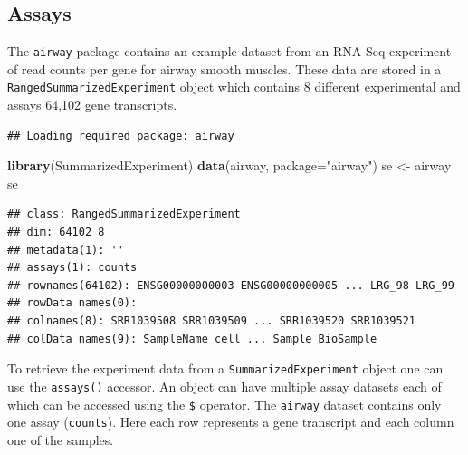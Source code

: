 \documentclass[]{article}
\newenvironment{Shaded}{\begin{snugshade}}{\end{snugshade}}
\newcommand{\DataTypeTok}[1]{\textcolor[rgb]{0.13,0.29,0.53}{#1}}
\newcommand{\KeywordTok}[1]{\textcolor[rgb]{0.13,0.29,0.53}{\textbf{#1}}}
\newcommand{\NormalTok}[1]{#1}
\newcommand{\OperatorTok}[1]{\textcolor[rgb]{0.81,0.36,0.00}{\textbf{#1}}}
\newcommand{\StringTok}[1]{\textcolor[rgb]{0.31,0.60,0.02}{#1}}
\begin{document}
\hypertarget{assays}{%
\subsection{Assays}\label{assays}}

The \texttt{airway} package contains an example dataset from an RNA-Seq
experiment of read counts per gene for airway smooth muscles. These data
are stored in a \texttt{RangedSummarizedExperiment} object which
contains 8 different experimental and assays 64,102 gene transcripts.

\begin{verbatim}
## Loading required package: airway
\end{verbatim}

\begin{Shaded}
\begin{Highlighting}[]
\KeywordTok{library}\NormalTok{(SummarizedExperiment)}
\KeywordTok{data}\NormalTok{(airway, }\DataTypeTok{package=}\StringTok{"airway"}\NormalTok{)}
\NormalTok{se <-}\StringTok{ }\NormalTok{airway}
\NormalTok{se}
\end{Highlighting}
\end{Shaded}

\begin{verbatim}
## class: RangedSummarizedExperiment 
## dim: 64102 8 
## metadata(1): ''
## assays(1): counts
## rownames(64102): ENSG00000000003 ENSG00000000005 ... LRG_98 LRG_99
## rowData names(0):
## colnames(8): SRR1039508 SRR1039509 ... SRR1039520 SRR1039521
## colData names(9): SampleName cell ... Sample BioSample
\end{verbatim}

To retrieve the experiment data from a \texttt{SummarizedExperiment}
object one can use the \texttt{assays()} accessor. An object can have
multiple assay datasets each of which can be accessed using the
\texttt{\$} operator. The \texttt{airway} dataset contains only one
assay (\texttt{counts}). Here each row represents a gene transcript and
each column one of the samples.

\begin{Shaded}
\end{Shaded}
\end{document}
